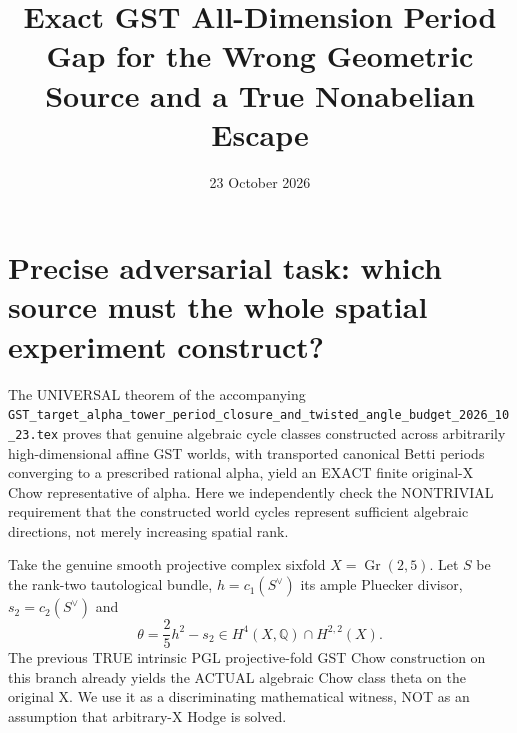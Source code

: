 \documentclass[11pt]{article}
\title{Exact GST All-Dimension Period Gap for the Wrong Geometric Source and a True Nonabelian Escape}
\date{23 October 2026}
\begin{document}
\maketitle
\section{Precise adversarial task: which source must the whole spatial experiment construct?}
The UNIVERSAL theorem of the accompanying
\texttt{GST\_target\_alpha\_tower\_period\_closure\_and\_twisted\_angle\_budget\_2026\_10\_23.tex}
proves that genuine algebraic cycle classes constructed across
arbitrarily high-dimensional affine GST worlds, with
transported canonical Betti periods converging to a
prescribed rational alpha, yield an EXACT finite
original-X Chow representative of alpha.
Here we independently check the NONTRIVIAL requirement
that the constructed world cycles represent sufficient
algebraic directions, not merely increasing spatial rank.

Take the genuine smooth projective complex sixfold
$X=\operatorname{Gr}(2,5)$.
Let $S$ be the rank-two tautological bundle,
$h=c_1(S^\vee)$ its ample Pluecker divisor,
$s_2=c_2(S^\vee)$ and
\[
 \boxed{\theta=\frac25h^2-s_2\in
    H^{4}(X,\mathbb Q)\cap H^{2,2}(X).}          \tag{1}
\]
The previous TRUE intrinsic PGL projective-fold GST
Chow construction on this branch already yields the
ACTUAL algebraic Chow class theta on the original X.
We use it as a discriminating mathematical witness,
NOT as an assumption that arbitrary-X Hodge is solved.
\end{document}
